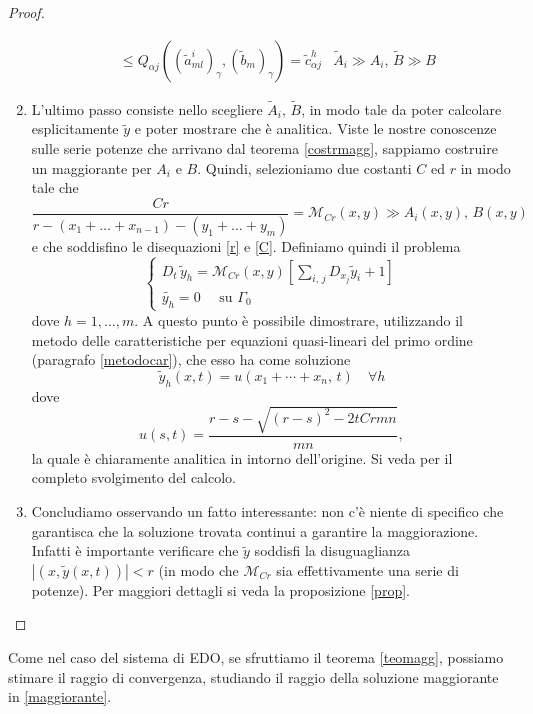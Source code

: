\begin{proof}
\begin{enumerate}
\begin{align*}
&\leq Q_{\alpha j}\left((\widetilde{a}^i_{ml})_\gamma, (\widetilde{b}_m)_\gamma\right) = \widetilde{c}^h_{\alpha j}
& \widetilde{A}_i \gg A_i, \, \widetilde{B} \gg B
\end{align*}
\item L'ultimo passo consiste nello scegliere $\widetilde{A}_i, \, \widetilde{B}$, in modo tale da poter calcolare esplicitamente $\widetilde{y}$ e poter mostrare che è analitica. Viste le nostre conoscenze sulle serie potenze che arrivano dal teorema \ref{costrmagg}, sappiamo costruire un maggiorante per $A_i$ e $B$. Quindi, selezioniamo due costanti $C$ ed $r$ in modo tale che 
$$\frac{Cr}{r-(x_1+\ldots +x_{n-1})-(y_1+\ldots +y_m)}=\mathcal{M}_{Cr}(x,y) \gg A_i(x,y),\, B(x,y)$$
e che soddisfino le disequazioni \eqref{r} e \eqref{C}. Definiamo quindi il problema
\begin{equation*}
\begin{cases}
D_t \, \widetilde{y}_h = \mathcal{M}_{Cr} (x,y) \left[\sum\limits_{i,\, j} D_{x_j}\widetilde{y}_i+1 \right] \\
\widetilde{y_h}=0 \quad \text{ su } \Gamma_0
\end{cases}
\end{equation*}
dove $h=1,\ldots, m$. A questo punto è possibile dimostrare, utilizzando il metodo delle caratteristiche per equazioni quasi-lineari del primo ordine (paragrafo \ref{metodocar}), che esso ha come soluzione
\begin{equation}\label{maggiorante}
\widetilde{y}_h(x,t)=u(x_1+\cdots +x_n,\,t) \quad \forall h
\end{equation}
dove
\begin{equation}\label{sol}
u(s,t)=\frac{r-s-\sqrt{(r-s)^2-2tCrmn}}{mn},
\end{equation}
la quale è chiaramente analitica in intorno dell'origine. Si veda \cite[cap.1]{Folland} per il completo svolgimento del calcolo.
\item Concludiamo osservando un fatto interessante: non c'è niente di specifico che garantisca che la soluzione trovata continui a garantire la maggiorazione. Infatti è importante verificare che $\widetilde{y}$ soddisfi la disuguaglianza $|(x,\widetilde{y}(x,t))|< r$ (in modo che $\mathcal{M}_{Cr}$ sia effettivamente una serie di potenze). Per maggiori dettagli si veda la proposizione \ref{prop}.
\end{enumerate}
\end{proof}

\newpage

Come nel caso del sistema di EDO, se sfruttiamo il teorema \ref{teomagg}, possiamo stimare il raggio di convergenza, studiando il raggio della soluzione maggiorante in \eqref{maggiorante}. 

